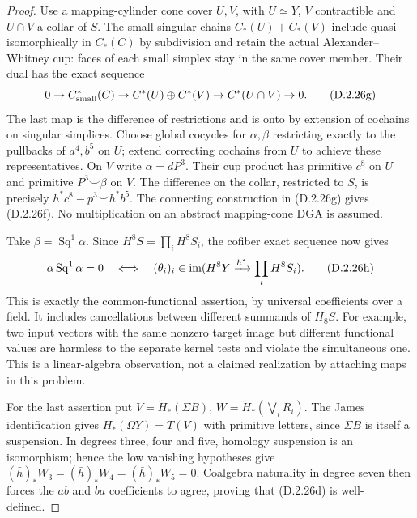 \begin{proof}
Use a mapping-cylinder cone cover $U,V$, with $U\simeq Y$,
$V$ contractible and $U\cap V$ a collar of $S$.
The small singular chains $C_*(U)+C_*(V)$ include
quasi-isomorphically in $C_*(C)$ by subdivision and retain the
actual Alexander--Whitney cup: faces of each small simplex stay
in the same cover member. Their dual has the exact sequence
\[
 0\to C^*_{\rm small}(C)\to C^*(U)\oplus C^*(V)
       \to C^*(U\cap V)\to0.
 \tag{D.2.26g}
\]
The last map is the difference of restrictions and is onto by
extension of cochains on singular simplices.
Choose global cocycles for $\alpha,\beta$ restricting exactly
to the pullbacks of $a^4,b^5$ on $U$; extend correcting cochains
from $U$ to achieve these representatives. On $V$ write
$\alpha=dP^3$. Their cup product has primitive $c^8$ on $U$
and primitive $P^3\smile\beta$ on $V$. The difference on the
collar, restricted to $S$, is precisely
$h^*c^8-p^3\smile h^*b^5$. The connecting construction in
\textup{(D.2.26g)} gives \textup{(D.2.26f)}.
No multiplication on an abstract mapping-cone DGA is assumed.

Take $\beta=\operatorname{Sq}^1\alpha$. Since
$H^8S=\prod_iH^8S_i$, the cofiber exact sequence now gives
\[
 \alpha\operatorname{Sq}^1\alpha=0
 \quad\Longleftrightarrow\quad
 (\theta_i)_i\in\operatorname{im}(H^8Y\xrightarrow{h^*}\prod_iH^8S_i).
 \tag{D.2.26h}
\]
This is exactly the common-functional assertion, by universal
coefficients over a field. It includes cancellations between
different summands of $H_8S$. For example, two input vectors
with the same nonzero target image but different functional
values are harmless to the separate kernel tests and violate
the simultaneous one. This is a linear-algebra observation,
not a claimed realization by attaching maps in this problem.

For the last assertion put $V=\widetilde H_*(\Sigma B)$,
$W=\widetilde H_*(\bigvee_iR_i)$. The James identification
gives $H_*(\Omega Y)=T(V)$ with primitive letters, since
$\Sigma B$ is itself a suspension. In degrees three, four and
five, homology suspension is an isomorphism; hence the low
vanishing hypotheses give $(\bar h)_*W_3=(\bar h)_*W_4
=(\bar h)_*W_5=0$. Coalgebra naturality in degree seven
then forces the $ab$ and $ba$ coefficients to agree, proving
that \textup{(D.2.26d)} is well-defined.


\end{proof}
